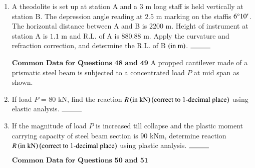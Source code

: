 \documentclass[journal,onecolumn]{IEEEtran}
\theoremstyle{remark}
\begin{document}
\begin{enumerate}
    \item A theodolite is set up at station A and a $3$ m long staff is held vertically at station B. The depression
angle reading at $2.5$ m marking on the staffis $6\degree 10^{\prime}$. The horizontal distance between A and B is
$2200$ m. Height of instrument at station A is $1.1$ m and R.L. of A is $880.88$ m. Apply the curvature
and refraction correction, and determine the R.L. of B $\left(\text{in m}\right)$. $\rule{1cm}{0.15mm}$ 

	$\textbf{Common Data for Questions 48 and 49}$
	\newline
    A propped cantilever made of a prismatic steel beam is subjected to a concentrated load $P$ at mid span as shown.
	\begin{center}
	\end{center}

	\item If load $P$ = $80$ kN, find the reaction $R \left(\text{in kN}\right) \left(\text{correct to } 1 \text{-decimal place}\right)$ using elastic analysis. $\rule{1cm}{0.15mm}$ 

	\item If the magnitude of load $P$ is increased till collapse and the plastic moment carrying capacity of steel beam section is $90$ kNm, determine reaction $R \left(\text{in kN}\right) \left(\text{correct to } 1 \text{-decimal place}\right)$ using plastic analysis. $\rule{1cm}{0.15mm}$ 

	$\textbf{Common Data for Questions 50 and 51}$
	\newline


\end{enumerate}
\end{document}
